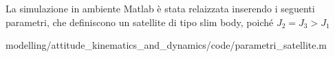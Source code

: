 La simulazione in ambiente Matlab è stata relaizzata inserendo i seguenti
parametri, che definiscono un satellite di tipo slim body, poiché $J_2=J_3>J_1$

{modelling/attitude_kinematics_and_dynamics/code/parametri_satellite.m}

